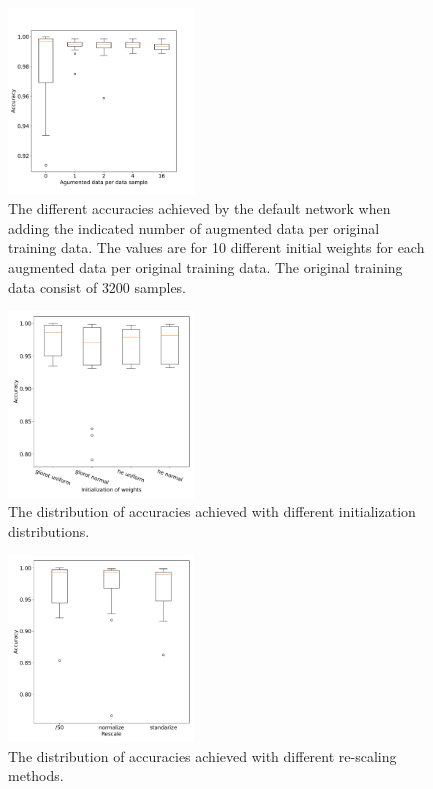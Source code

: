 \documentclass[prl,twocolumn]{revtex4-1}
\begin{document}
\begin{figure}[!tb]
  \includegraphics[width=0.44\textwidth]{task_1/figures/ag_train_box_30.pdf}
  \caption{The different accuracies achieved by the default network when adding the indicated number of augmented data per original training data. The values are for 10 different initial weights for each augmented data per original training data. The original training data consist of $3200$ samples.}
  \label{fig:augmented_train_sampels}
\end{figure}


\begin{figure}[!tb]
  \includegraphics[width=0.44\textwidth]{task_1/figures/init_weights_box_30.pdf}
  \caption{
  The distribution of accuracies achieved with different initialization distributions. 
  }
  \label{fig:weight_init_box}
\end{figure}


\begin{figure}[!tb]
  \includegraphics[width=0.44\textwidth]{task_1/figures/rescale_box_30.pdf}
  \caption{
  The distribution of accuracies achieved with different re-scaling methods. 
  }
  \label{fig:rescale_box}
\end{figure}
\end{document}
